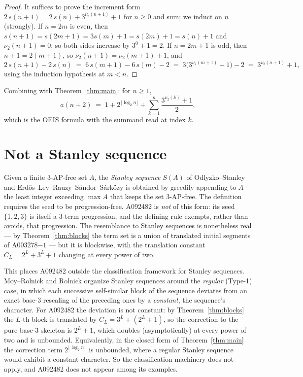 \documentclass[12pt]{article}
\theoremstyle{plain}
\theoremstyle{definition}
\theoremstyle{remark}
\begin{document}
\begin{proof}
It suffices to prove the increment form
$2\,s(n+1)=2\,s(n)+3^{\nu_2(n+1)}+1$ for $n\geq 0$ and sum; we
induct on $n$ (strongly).  If $n=2m$ is even, then
$s(n+1)=s(2m+1)=3s(m)+1=s(2m)+1=s(n)+1$ and $\nu_2(n+1)=0$, so
both sides increase by $3^0+1=2$.  If $n=2m+1$ is odd, then
$n+1=2(m+1)$, so $\nu_2(n+1)=\nu_2(m+1)+1$, and
\[
2\,s(n+1)-2\,s(n) \;=\; 6\,s(m+1)-6\,s(m)-2
\;=\; 3\bigl(3^{\nu_2(m+1)}+1\bigr)-2
\;=\; 3^{\nu_2(n+1)}+1,
\]
using the induction hypothesis at $m<n$.
\end{proof}

Combining with Theorem~\ref{thm:main}: for $n\geq 1$,
\[
a(n+2) \;=\; 1+2^{\lfloor\log_2 n\rfloor}
+\sum_{k=1}^{n}\frac{3^{\nu_2(k)}+1}{2},
\]
which is the OEIS formula with the summand read at index $k$.

\section{Not a Stanley sequence}\label{sec:stanley}

Given a finite $3$-AP-free set $A$, the \emph{Stanley sequence}
$S(A)$ of Odlyzko--Stanley \cite{OS1978} and
Erd\H{o}s--Lev--Rauzy--S\'andor--S\'ark\"ozy \cite{ELRSS1999} is
obtained by greedily appending to $A$ the least integer exceeding
$\max A$ that keeps the set $3$-AP-free.  The definition requires the
seed to be progression-free.  A092482 is \emph{not} of this form:
its seed $\{1,2,3\}$ is itself a $3$-term progression, and the
defining rule exempts, rather than avoids, that progression.  The
resemblance to Stanley sequences is nonetheless real --- by
Theorem~\ref{thm:blocks} the term set is a union of translated
initial segments of A003278$-1$ --- but it is blockwise, with the
translation constant $C_L=2^L+3^L+1$ changing at every power of
two.

This places A092482 outside the classification framework for
Stanley sequences.  Moy--Rolnick \cite{MoyRolnick2016} and
Rolnick \cite{Rolnick2017} organize Stanley sequences around the
\emph{regular} (Type-1) case, in which each successive
self-similar block of the sequence deviates from an exact
base-$3$ rescaling of the preceding ones by a \emph{constant},
the sequence's character.  For A092482 the deviation is not
constant: by Theorem~\ref{thm:blocks} the $L$-th block is
translated by $C_L=3^L+(2^L+1)$, so the correction to the pure
base-$3$ skeleton is $2^L+1$, which doubles (asymptotically) at
every power of two and is unbounded.  Equivalently, in the closed
form of Theorem~\ref{thm:main} the correction term
$2^{\lfloor\log_2 n\rfloor}$ is unbounded, where a regular
Stanley sequence would exhibit a constant character.  So the
classification machinery does not apply, and A092482 does not
appear among its examples.
\end{document}
